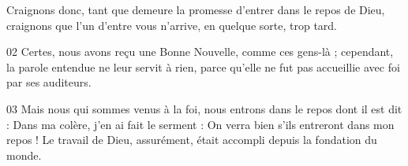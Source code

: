 Craignons donc, tant que demeure la promesse d’entrer dans le repos de Dieu, craignons que l’un d’entre vous n’arrive, en quelque sorte, trop tard.

02 Certes, nous avons reçu une Bonne Nouvelle, comme ces gens-là ; cependant, la parole entendue ne leur servit à rien, parce qu’elle ne fut pas accueillie avec foi par ses auditeurs.

03 Mais nous qui sommes venus à la foi, nous entrons dans le repos dont il est dit : Dans ma colère, j’en ai fait le serment : On verra bien s’ils entreront dans mon repos ! Le travail de Dieu, assurément, était accompli depuis la fondation du monde.
